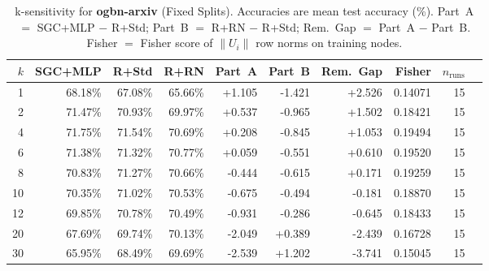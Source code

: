 \begin{table}[t]
\centering\small\setlength{\tabcolsep}{5pt}
\caption{k-sensitivity for \textbf{ogbn-arxiv} (Fixed Splits). Accuracies are mean test accuracy (\%). Part~A $=$ SGC+MLP $-$ R+Std; Part~B $=$ R+RN $-$ R+Std; Rem.~Gap $=$ Part~A $-$ Part~B. Fisher $=$ Fisher score of $\|U_i\|$ row norms on training nodes.}
\label{tab:exp8_per_dataset_ogbn-arxiv_fixed}
\begin{tabular}{rrrrrrrrrr}
\toprule
$k$ & SGC+MLP & R+Std & R+RN & Part~A & Part~B & Rem.~Gap & Fisher & $n_{\mathrm{runs}}$ \\
\midrule
1 & 68.18\% & 67.08\% & 65.66\% & +1.105 & -1.421 & +2.526 & 0.14071 & 15 \\
2 & 71.47\% & 70.93\% & 69.97\% & +0.537 & -0.965 & +1.502 & 0.18421 & 15 \\
4 & 71.75\% & 71.54\% & 70.69\% & +0.208 & -0.845 & +1.053 & 0.19494 & 15 \\
6 & 71.38\% & 71.32\% & 70.77\% & +0.059 & -0.551 & +0.610 & 0.19520 & 15 \\
8 & 70.83\% & 71.27\% & 70.66\% & -0.444 & -0.615 & +0.171 & 0.19259 & 15 \\
10 & 70.35\% & 71.02\% & 70.53\% & -0.675 & -0.494 & -0.181 & 0.18870 & 15 \\
12 & 69.85\% & 70.78\% & 70.49\% & -0.931 & -0.286 & -0.645 & 0.18433 & 15 \\
20 & 67.69\% & 69.74\% & 70.13\% & -2.049 & +0.389 & -2.439 & 0.16728 & 15 \\
30 & 65.95\% & 68.49\% & 69.69\% & -2.539 & +1.202 & -3.741 & 0.15045 & 15 \\
\bottomrule
\end{tabular}
\end{table}
